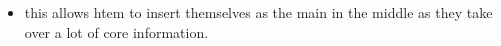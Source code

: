 \begin{itemize}
\begin{itemize}
    \begin{itemize}
    \tightlist
    \item
      this allows htem to insert themselves as the main in the middle as
      they take over a lot of core information.
    \end{itemize}
  \end{itemize}
\end{itemize}
